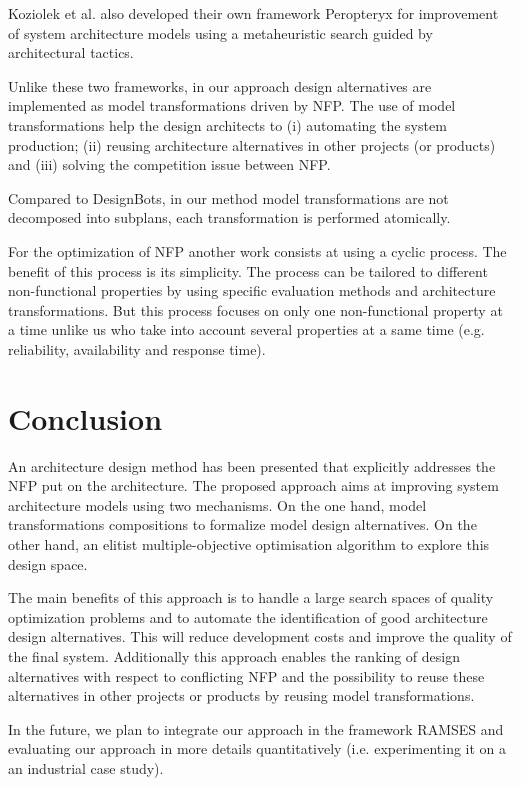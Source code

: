 \documentclass[conference]{IEEEtran}
\begin{document}
Koziolek et al.\cite{Koziolek:2011:PAA:2000259.2000267} also developed their own framework Peropteryx for improvement of system architecture models using a metaheuristic search guided by architectural tactics.

Unlike these two frameworks, in our approach design alternatives are implemented as model transformations driven by NFP. The use of model transformations help the design architects to (i) automating the system production; (ii) reusing architecture alternatives in other projects (or products) and (iii) solving the competition issue between NFP. 

Compared to DesignBots\cite{Diaz-Pace:2007:UPT:1784860.1784865}, in our method model transformations are not decomposed into subplans, each transformation is performed atomically.

For the optimization of NFP another work consists at using a cyclic process\cite{Bosch99softwarearchitecture}. The benefit of this process is its simplicity. The process can be tailored to different non-functional properties by using specific evaluation methods and architecture transformations. But this process focuses on only one non-functional property at a time unlike us who take into account several properties at a same time (e.g. reliability, availability and response time).

\section{Conclusion}
\label{Conclu}
An architecture design method has been presented that explicitly addresses the NFP put on the architecture. The proposed approach aims at improving system architecture models using two mechanisms. On the one hand, model transformations compositions to formalize model design alternatives. On the other hand, an elitist multiple-objective optimisation algorithm to explore this design space.

The main benefits of this approach is to handle a large search spaces of quality optimization problems and to automate the identification of good architecture design alternatives. This will reduce development costs and improve the quality of the final system. Additionally this approach enables the ranking of design alternatives with respect to conflicting NFP and the possibility to reuse these alternatives in other projects or products by reusing model transformations.

In the future, we plan to integrate our approach in the framework RAMSES and evaluating our approach in more details quantitatively (i.e. experimenting it on a an industrial case study)\cite{greg}.
\end{document}
